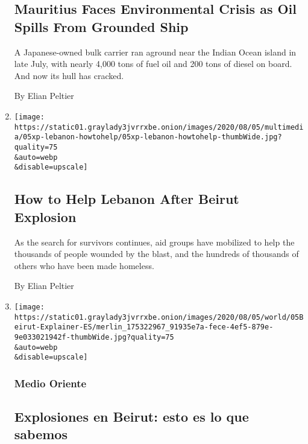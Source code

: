 \begin{enumerate}
  \hypertarget{mauritius-faces-environmental-crisis-as-oil-spills-from-grounded-ship}{%
  \subsection{Mauritius Faces Environmental Crisis as Oil Spills From
  Grounded
  Ship}\label{mauritius-faces-environmental-crisis-as-oil-spills-from-grounded-ship}}

  A Japanese-owned bulk carrier ran aground near the Indian Ocean island
  in late July, with nearly 4,000 tons of fuel oil and 200 tons of
  diesel on board. And now its hull has cracked.

  By Elian Peltier
\item
  \href{/2020/08/05/world/how-to-help-lebanon-beirut.html}{}

  \texttt{[image: https://static01.graylady3jvrrxbe.onion/images/2020/08/05/multimedia/05xp-lebanon-howtohelp/05xp-lebanon-howtohelp-thumbWide.jpg?quality=75\\\&auto=webp\\\&disable=upscale]}

  \hypertarget{how-to-help-lebanon-after-beirut-explosion}{%
  \subsection{How to Help Lebanon After Beirut
  Explosion}\label{how-to-help-lebanon-after-beirut-explosion}}

  As the search for survivors continues, aid groups have mobilized to
  help the thousands of people wounded by the blast, and the hundreds of
  thousands of others who have been made homeless.

  By Elian Peltier
\item
  \href{/es/2020/08/05/espanol/mundo/explosion-beirut-que-paso.html}{}

  \texttt{[image: https://static01.graylady3jvrrxbe.onion/images/2020/08/05/world/05Beirut-Explainer-ES/merlin\_175322967\_91935e7a-fece-4ef5-879e-9e033021942f-thumbWide.jpg?quality=75\\\&auto=webp\\\&disable=upscale]}

  \hypertarget{medio-oriente}{%
  \subsubsection{Medio Oriente}\label{medio-oriente}}

  \hypertarget{explosiones-en-beirut-esto-es-lo-que-sabemos}{%
  \subsection{Explosiones en Beirut: esto es lo que
  sabemos}\label{explosiones-en-beirut-esto-es-lo-que-sabemos}}


\end{enumerate}
